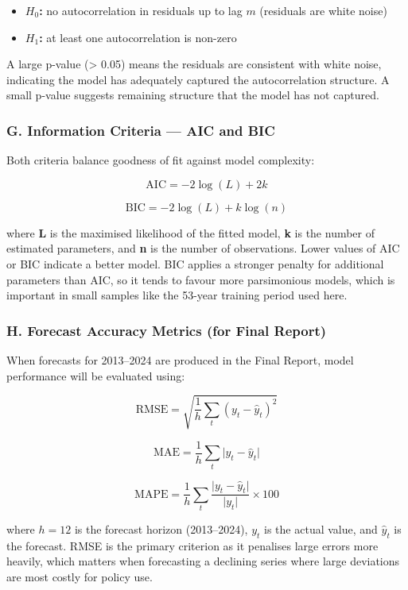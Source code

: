\documentclass[
]{article}
\providecommand{\tightlist}{%
  \setlength{\itemsep}{0pt}\setlength{\parskip}{0pt}}
\begin{document}
\begin{itemize}
\tightlist
\item
  \textbf{\(H_0\):} no autocorrelation in residuals up to lag \(m\)
  (residuals are white noise)\\
\item
  \textbf{\(H_1\):} at least one autocorrelation is non-zero
\end{itemize}

A large p-value (\textgreater{} 0.05) means the residuals are consistent
with white noise, indicating the model has adequately captured the
autocorrelation structure. A small p-value suggests remaining structure
that the model has not captured.

\subsubsection{G. Information Criteria --- AIC and
BIC}\label{g.-information-criteria-aic-and-bic}

Both criteria balance goodness of fit against model complexity:

\[
\mathrm{AIC} = -2\log(L) + 2k
\]

\[
\mathrm{BIC} = -2\log(L) + k\log(n)
\]

where \textbf{L} is the maximised likelihood of the fitted model,
\textbf{k} is the number of estimated parameters, and \textbf{n} is the
number of observations. Lower values of AIC or BIC indicate a better
model. BIC applies a stronger penalty for additional parameters than
AIC, so it tends to favour more parsimonious models, which is important
in small samples like the 53-year training period used here.

\subsubsection{H. Forecast Accuracy Metrics (for Final
Report)}\label{h.-forecast-accuracy-metrics-for-final-report}

When forecasts for 2013--2024 are produced in the Final Report, model
performance will be evaluated using:

\[
\mathrm{RMSE} = \sqrt{\frac{1}{h}\sum_t (y_t - \hat{y}_t)^2}
\]

\[
\mathrm{MAE} = \frac{1}{h}\sum_t \lvert y_t - \hat{y}_t \rvert
\]

\[
\mathrm{MAPE} = \frac{1}{h}\sum_t \frac{\lvert y_t - \hat{y}_t \rvert}{\lvert y_t \rvert}\times 100
\]

where \(h = 12\) is the forecast horizon (2013--2024), \(y_t\) is the
actual value, and \(\hat{y}_t\) is the forecast. RMSE is the primary
criterion as it penalises large errors more heavily, which matters when
forecasting a declining series where large deviations are most costly
for policy use.
\end{document}
